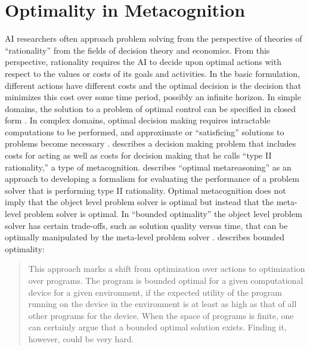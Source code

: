 







\section{Optimality in Metacognition}

AI researchers often approach problem solving from the perspective of
theories of ``rationality'' from the fields of decision theory and
economics.  From this perspective, rationality requires the AI to
decide upon optimal actions with respect to the values or costs of its
goals and activities.  In the basic formulation, different actions
have different costs and the optimal decision is the decision that
minimizes this cost over some time period, possibly an infinite
horizon.  In simple domains, the solution to a problem of optimal
control can be specified in closed form \cite[]{bertsekas:1995}.  In
complex domains, optimal decision making requires intractable
computations to be performed, and approximate or ``satisficing''
solutions to problems become necessary \cite[]{simon:1957,simon:1982}.
\cite{good:1971} describes a decision making problem that includes
costs for acting as well as costs for decision making that he calls
``type II rationality,'' a type of metacognition.
\cite{zilberstein:2008} describes ``optimal metareasoning'' as an
approach to developing a formalism for evaluating the performance of a
problem solver that is performing type II rationality.  Optimal
metacognition does not imply that the object level problem solver is
optimal but instead that the meta-level problem solver is optimal.  In
``bounded optimality'' the object level problem solver has certain
trade-offs, such as solution quality versus time, that can be
optimally manipulated by the meta-level problem solver
\cite[]{russell:1991}.  \cite{zilberstein:2008} describes bounded
optimality:
\begin{quote}
This approach marks a shift from optimization over actions to
optimization over programs.  The program is bounded optimal for a
given computational device for a given environment, if the expected
utility of the program running on the device in the environment is at
least as high as that of all other programs for the device.  When the
space of programs is finite, one can certainly argue that a bounded
optimal solution exists.  Finding it, however, could be very hard.
\end{quote}
